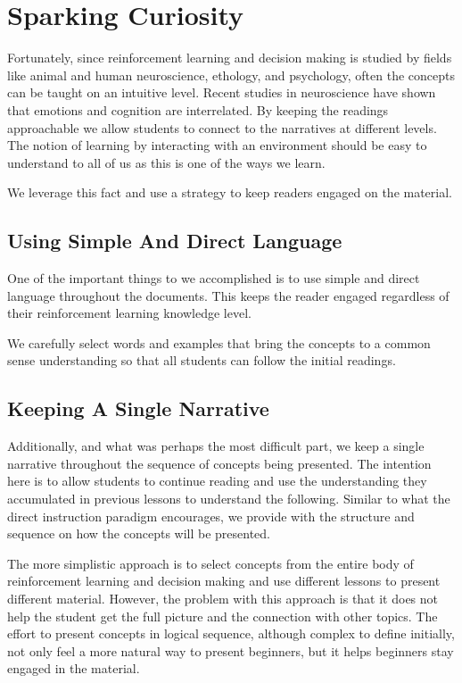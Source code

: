 \documentclass[11pt]{article} %
\begin{document}
\section{Sparking Curiosity}

Fortunately, since reinforcement learning and decision making is studied
by fields like animal and human neuroscience, ethology, and psychology\cite{suttons98},
often the concepts can be taught on an intuitive level.
Recent studies in neuroscience have shown that emotions and cognition are
interrelated\cite{intuition}. By keeping the readings approachable we allow
students to connect to the narratives at different levels. The notion of
learning by interacting with an environment should be easy
to understand to all of us as this is one of the ways we learn.

We leverage this fact and use a strategy to keep readers engaged on the
material.

\subsection{Using Simple And Direct Language}

One of the important things to we accomplished is to use simple and direct
language throughout the documents. This keeps the reader engaged regardless
of their reinforcement learning knowledge level.

We carefully select words and examples that bring the concepts to a
common sense understanding so that all students can follow the initial
readings.

\subsection{Keeping A Single Narrative}

Additionally, and what was perhaps the most difficult part, we keep a single
narrative throughout the sequence of concepts being presented. The intention
here is to allow students to continue reading and use the understanding they
accumulated in previous lessons to understand the following. Similar to what
the direct instruction paradigm\cite{directinstruction} encourages, we provide
with the structure and sequence on how the concepts will be presented.

The more simplistic approach is to select concepts from the entire body of
reinforcement learning and decision making and use different lessons to present
different material. However, the problem with this approach is that it does
not help the student get the full picture and the connection with other topics.
The effort to present concepts in logical sequence, although complex to define
initially, not only feel a more natural way to present beginners, but it helps
beginners stay engaged in the material.
\end{document}
